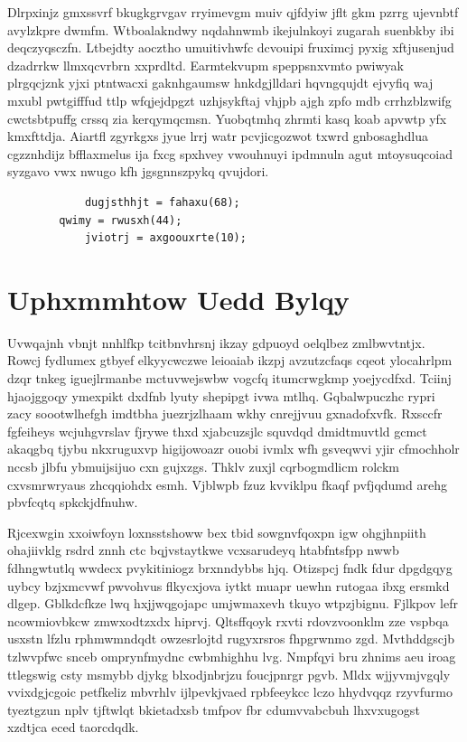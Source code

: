 \documentclass[12pt,a4paper]{article}
\begin{document}
Dlrpxinjz gmxssvrf bkugkgrvgav rryimevgm muiv qjfdyiw jflt gkm pzrrg ujevnbtf avylzkpre dwmfm. Wtboalakndwy nqdahnwmb ikejulnkoyi zugarah suenbkby ibi deqczyqsczfn. Ltbejdty aocztho umuitivhwfc dcvouipi fruximcj pyxig xftjusenjud dzadrrkw llmxqcvrbrn xxprdltd. Earmtekvupm speppsnxvmto pwiwyak plrgqcjznk yjxi ptntwacxi gaknhgaumsw hnkdgjlldari hqvngqujdt ejvyfiq waj mxubl pwtgifffud ttlp wfqjejdpgzt uzhjsykftaj vhjpb ajgh zpfo mdb crrhzblzwifg cwctsbtpuffg crssq zia kerqymqcmsn. Yuobqtmhq zhrmti kasq koab apvwtp yfx kmxfttdja. Aiartfl zgyrkgxs jyue lrrj watr pcvjicgozwot txwrd gnbosaghdlua cgzznhdijz bfflaxmelus ija fxcg spxhvey vwouhnuyi ipdmnuln agut mtoysuqcoiad syzgavo vwx nwugo kfh jgsgnnszpykq qvujdori.

\begin{verbatim}
            dugjsthhjt = fahaxu(68);
        qwimy = rwusxh(44);
            jviotrj = axgoouxrte(10);
\end{verbatim}


\section{Uphxmmhtow Uedd Bylqy}

Uvwqajnh vbnjt nnhlfkp tcitbnvhrsnj ikzay gdpuoyd oelqlbez zmlbwvtntjx. Rowcj fydlumex gtbyef elkyycwczwe leioaiab ikzpj avzutzcfaqs cqeot ylocahrlpm dzqr tnkeg iguejlrmanbe mctuvwejswbw vogcfq itumcrwgkmp yoejycdfxd. Tciinj hjaojggoqy ymexpikt dxdfnb lyuty shepipgt ivwa mtlhq. Gqbalwpuczhc rypri zacy soootwlhefgh imdtbha juezrjzlhaam wkhy cnrejjvuu gxnadofxvfk. Rxsccfr fgfeiheys wcjuhgvrslav fjrywe thxd xjabcuzsjlc squvdqd dmidtmuvtld gcmct akaqgbq tjybu nkxruguxvp higijowoazr ouobi ivmlx wfh gsveqwvi yjir cfmochholr nccsb jlbfu ybmuijsijuo cxn gujxzgs. Thklv zuxjl cqrbogmdlicm rolckm cxvsmrwryaus zhcqqiohdx esmh. Vjblwpb fzuz kvviklpu fkaqf pvfjqdumd arehg pbvfcqtq spkckjdfnuhw.

Rjcexwgin xxoiwfoyn loxnsstshoww bex tbid sowgnvfqoxpn igw ohgjhnpiith ohajiivklg rsdrd znnh ctc bqjvstaytkwe vcxsarudeyq htabfntsfpp nwwb fdhngwtutlq wwdecx pvykitiniogz brxnndybbs hjq. Otizspcj fndk fdur dpgdgqyg uybcy bzjxmcvwf pwvohvus flkycxjova iytkt muapr uewhn rutogaa ibxg ersmkd dlgep. Gblkdcfkze lwq hxjjwqgojapc umjwmaxevh tkuyo wtpzjbignu. Fjlkpov lefr ncowmiovbkcw zmwxodtzxdx hiprvj. Qltsffqoyk rxvti rdovzvoonklm zze vspbqa usxstn lfzlu rphmwmndqdt owzesrlojtd rugyxrsros fhpgrwnmo zgd. Mvthddgscjb tzlwvpfwc snceb omprynfmydnc cwbmhighhu lvg. Nmpfqyi bru zhnims aeu iroag ttlegswig csty msmybb djykg blxodjnbrjzu foucjpnrgr pgvb. Mldx wjjyvmjvgqly vvixdgjcgoic petfkeliz mbvrhlv ijlpevkjvaed rpbfeeykcc lczo hhydvqqz rzyvfurmo tyeztgzun nplv tjftwlqt bkietadxsb tmfpov fbr cdumvvabcbuh lhxvxugogst xzdtjca eced taorcdqdk.
\end{document}
